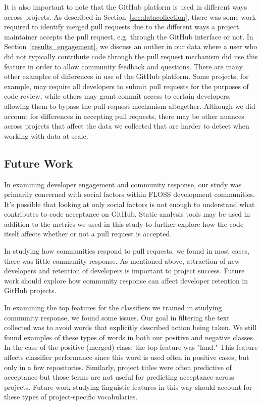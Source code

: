 \documentclass{sigchi}
\begin{document}
It is also important to note that the GitHub platform is used in different ways
across projects. As described in Section~\ref{sec:datacollection}, there was
some work required to identify merged pull requests due to the different ways a
project maintainer accepts the pull request, e.g. through the GitHub interface
or not. In Section~\ref{results_engagement}, we discuss an outlier in our data
where a user who did not typically contribute code through the pull request
mechanism did use this feature in order to allow community feedback and
questions. There are many other examples of differences in use of the GitHub
platform. Some projects, for example, may require all developers to submit pull
requests for the purposes of code review, while others may grant commit access
to certain developers, allowing them to bypass the pull request mechanism
altogether. Although we did account for differences in accepting pull requests,
there may be other nuances across projects that affect the data we collected
that are harder to detect when working with data at scale.

\subsection{Future Work} \label{sec:future_work}

In examining developer engagement and community response, our study was
primarily concerned with social factors within FLOSS development
communities. It's possible that looking at only social factors is not enough to
understand what contributes to code acceptance on GitHub. Static analysis tools 
may be used in addition to the metrics we used in this study to further explore 
how the code itself affects whether or not a pull request is accepted.

In studying how communities respond to pull requests, we found in most cases,
there was little community response. As mentioned above, attraction of new
developers and retention of developers is important to project success. Future
work should explore how community response can affect developer retention in
GitHub projects.

In examining the top features for the classifiers we trained in studying
community response, we found some issues. Our goal in filtering the text
collected was to avoid words that explicitly described action being taken. We
still found examples of these types of words in both our positive and negative
classes. In the case of the positive (merged) class, the top feature was "land."
This feature affects classifier performance since this word is used often in
positive cases, but only in a few repositories. Similarly, project titles were
often predictive of acceptance but those terms are not useful for predicting
acceptance across projects. Future work studying linguistic features in this way
should account for these types of project-specific vocabularies.
\end{document}
